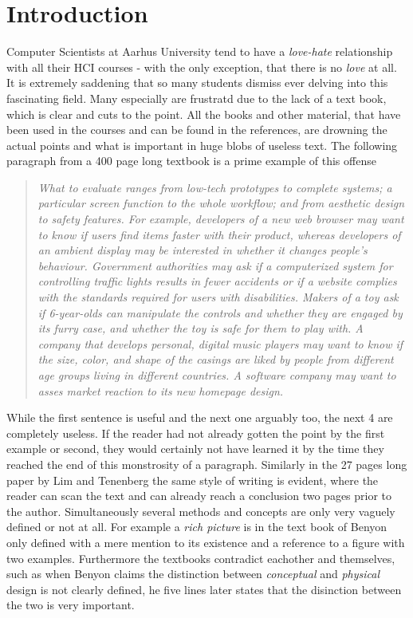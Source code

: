 \chapter{Introduction} \label{chap:introduction}
Computer Scientists at Aarhus University tend to have a \emph{love-hate} relationship with all their HCI courses - with the only exception, that there is no \emph{love} at all. It is extremely saddening that so many students dismiss ever delving into this fascinating field. Many especially are frustratd due to the lack of a text book, which is clear and cuts to the point. All the books and other material, that have been used in the courses and can be found in the references, are drowning the actual points and what is important in huge blobs of useless text. The following paragraph from a 400 page long textbook is a prime example of this offense

\blockcquote[p. 435]{rogers}{\it What to evaluate ranges from low-tech prototypes to complete systems; a particular screen function to the whole workflow; and from aesthetic design to safety features. For example, developers of a new web browser may want to know if users find items faster with their product, whereas developers of an ambient display may be interested in whether it changes people's behaviour. Government authorities may ask if a computerized system for controlling traffic lights results in fewer accidents or if a website complies with the standards required for users with disabilities. Makers of a toy ask if 6-year-olds can manipulate the controls and whether they are engaged by its furry case, and whether the toy is safe for them to play with. A company that develops personal, digital music players may want to know if the size, color, and shape of the casings are liked by people from different age groups living in different countries. A software company may want to asses market reaction to its new homepage design.}

\noindent While the first sentence is useful and the next one arguably too, the next 4 are completely useless. If the reader had not already gotten the point by the first example or second, they would certainly not have learned it by the time they reached the end of this monstrosity of a paragraph. Similarly in the 27 pages long paper by Lim and Tenenberg \cite{lim} the same style of writing is evident, where the reader can scan the text and can already reach a conclusion two pages prior to the author. Simultaneously several methods and concepts are only very vaguely defined or not at all. For example a \emph{rich picture} is in the text book of Benyon only defined with a mere mention to its existence and a reference to a figure with two examples. \cite[p. 51-52]{benyon_14} Furthermore the textbooks contradict eachother and themselves, such as when Benyon claims the distinction between \emph{conceptual} and \emph{physical} design is not clearly defined, he five lines later states that the disinction between the two is very important. \cite[p. 51]{benyon_14}

